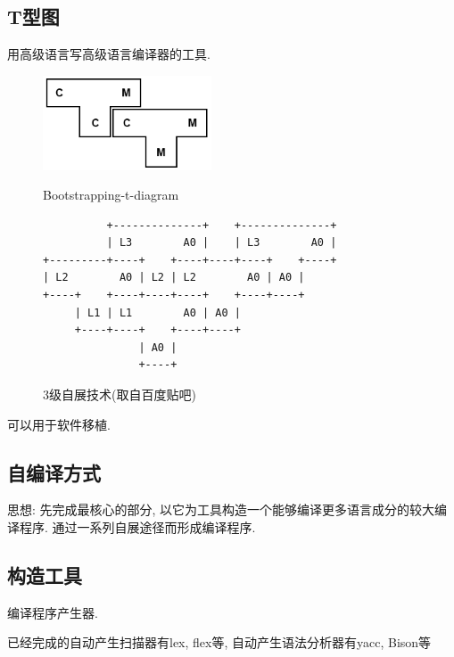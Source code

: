     \subsection{T型图}

        用高级语言写高级语言编译器的工具.

        \begin{figure}[h]\centering
            \begin{minipage}{0.5\linewidth} \centering
                \includegraphics[width=5cm]{compile_chaps/lect2_inc/Bootstrapping-t-diagram.png}
                \caption{Bootstrapping-t-diagram}
                \label{fig:2:bootstrapping}
            \end{minipage}
            \begin{minipage}{0.45\linewidth}
                {\small
\begin{verbatim}          +--------------+    +--------------+
          | L3        A0 |    | L3        A0 |
+---------+----+    +----+----+----+    +----+
| L2        A0 | L2 | L2        A0 | A0 |
+----+    +----+----+----+    +----+----+
     | L1 | L1        A0 | A0 |
     +----+----+    +----+----+
               | A0 |
               +----+\end{verbatim}}
                \caption{3级自展技术(取自百度贴吧)}
                \label{fig:2:3-self-extract}
            \end{minipage}
        \end{figure}


        可以用于软件移植.

    \subsection{自编译方式}

        思想: 先完成最核心的部分, 以它为工具构造一个能够编译更多语言成分的较大编译程序. 通过一系列自展途径而形成编译程序.

    \subsection{构造工具}

        编译程序产生器.

        已经完成的自动产生扫描器有lex, flex等, 自动产生语法分析器有yacc, Bison等

